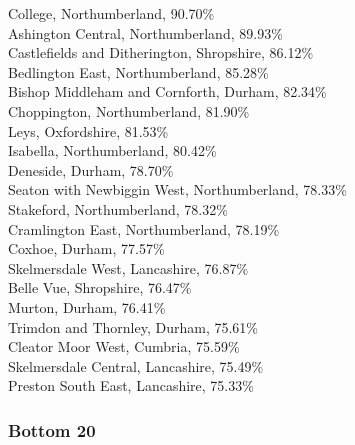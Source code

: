 \documentclass[a4paper,openany,10pt]{book}
\begin{document}
College, Northumberland, 90.70\%\\
Ashington Central, Northumberland, 89.93\%\\
Castlefields and Ditherington, Shropshire, 86.12\%\\
Bedlington East, Northumberland, 85.28\%\\
Bishop Middleham and Cornforth, Durham, 82.34\%\\
Choppington, Northumberland, 81.90\%\\
Leys, Oxfordshire, 81.53\%\\
Isabella, Northumberland, 80.42\%\\
Deneside, Durham, 78.70\%\\
Seaton with Newbiggin West, Northumberland, 78.33\%\\
Stakeford, Northumberland, 78.32\%\\
Cramlington East, Northumberland, 78.19\%\\
Coxhoe, Durham, 77.57\%\\
Skelmersdale West, Lancashire, 76.87\%\\
Belle Vue, Shropshire, 76.47\%\\
Murton, Durham, 76.41\%\\
Trimdon and Thornley, Durham, 75.61\%\\
Cleator Moor West, Cumbria, 75.59\%\\
Skelmersdale Central, Lancashire, 75.49\%\\
Preston South East, Lancashire, 75.33\%\\

\subsubsection*{Bottom 20}
\end{document}
